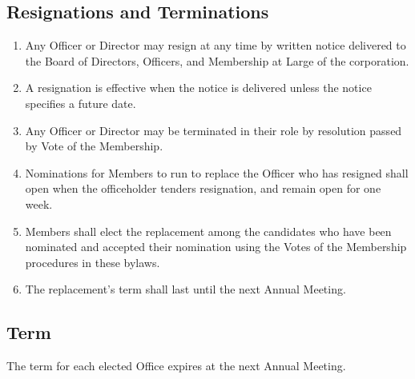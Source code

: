 \documentclass{article}
\begin{document}
\subsection{Resignations and Terminations}
\begin{enumerate}
\item Any Officer or Director may resign at any time by written notice delivered to the 
Board of Directors, Officers, and Membership at Large of the corporation.
\item A resignation is effective when the notice is delivered unless the notice specifies a 
future date.
\item Any Officer or Director may be terminated in their role by resolution passed by Vote 
of the Membership.
\item Nominations for Members to run to replace the Officer who has resigned shall open 
when the officeholder tenders resignation, and remain open for one week.
\item Members shall elect the replacement among the candidates who have been 
nominated and accepted their nomination using the Votes of the Membership procedures 
in these bylaws.
\item The replacement's term shall last until the next Annual Meeting.
\end{enumerate}
\subsection{Term}
The term for each elected Office expires at the next Annual Meeting.
\end{document}
